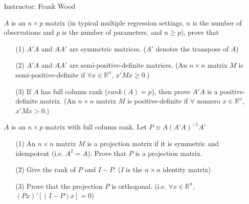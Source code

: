 \documentclass[12pt]{article}
\begin{document}
 \begin{center}
  Instructor: Frank Wood 
 \end{center}
{}
\finishfirstpage



 {
$A$ is an $n\times p$ matrix (in typical multiple regression settings, $n$ is the number of observations and $p$ is the number of parameters, and $n\ge p$), prove that
\begin{enumerate}
\item[(1)] $A'A$ and $AA'$ are symmetric matrices. ($A'$ denotes the transpose of $A$)
\item[(2)] $A'A$ and $AA'$ are semi-positive-definite matrices. (An $n\times n$ matrix $M$ is semi-positive-definite if $\forall x\in \mathbb{R}^n$, $x'Mx\ge0$.)
\item[(3)] If $A$ has full column rank ($rank(A)=p$), then prove $A'A$ is a positive-definite matrix. (An $n\times n$ matrix $M$ is positive-definite if $\forall$ nonzero $ x\in \mathbb{R}^n$, $x'Mx>0$.)
\end{enumerate}
}
 { \vfill
  \answer
} { 
 }

 {
 $A$ is an $n\times p$ matrix with full column rank. Let $P\equiv A(A'A)^{-1}A'$
\begin{enumerate}
\item[(1)] An $n\times n$ matrix $M$ is a projection matrix if it is symmetric and idempotent (i.e. $A^2=A$). Prove that $P$ is a projection matrix.
\item[(2)] Give the rank of $P$ and $I-P$. ($I$ is the $n\times n$ identity matrix)
\item[(3)] Prove that the projection $P$ is orthogonal. (i.e. $\forall x\in \mathbb{R}^n$, $(Px)'[(I-P)x]=0$)
\end{enumerate}
} { \vfill
  \answer
} { }
\end{document}
